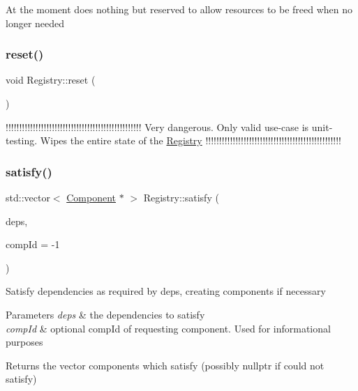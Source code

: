 At the moment does nothing but reserved to allow resources to be freed when no longer needed \mbox{\label{classtheoria_1_1core_1_1Registry_af66ab76f6173d7e7c99a0c47dc2bfd70}} 
\subsubsection{\texorpdfstring{reset()}{reset()}}
{\footnotesize\ttfamily void Registry\+::reset (\begin{DoxyParamCaption}{ }\end{DoxyParamCaption})}

!!!!!!!!!!!!!!!!!!!!!!!!!!!!!!!!!!!!!!!!!!!!!!!!!! Very dangerous. Only valid use-\/case is unit-\/testing. Wipes the entire state of the \hyperlink{classtheoria_1_1core_1_1Registry}{Registry} !!!!!!!!!!!!!!!!!!!!!!!!!!!!!!!!!!!!!!!!!!!!!!!!!! \mbox{\label{classtheoria_1_1core_1_1Registry_aaa8dbdd7993478eea310fa111e36d40a}} 
\subsubsection{\texorpdfstring{satisfy()}{satisfy()}}
{\footnotesize\ttfamily std\+::vector$<$ \hyperlink{classtheoria_1_1core_1_1Component}{Component} $\ast$ $>$ Registry\+::satisfy (\begin{DoxyParamCaption}\item[{const \hyperlink{classtheoria_1_1core_1_1Dependencies}{Dependencies} \&}]{deps,  }\item[{Comp\+Id}]{comp\+Id = {\ttfamily -\/1} }\end{DoxyParamCaption})}

Satisfy dependencies as required by deps, creating components if necessary


\begin{DoxyParams}{Parameters}
{\em deps} & the dependencies to satisfy \\
\hline
{\em comp\+Id} & optional comp\+Id of requesting component. Used for informational purposes \\
\hline
\end{DoxyParams}
\begin{DoxyReturn}{Returns}
the vector components which satisfy (possibly nullptr if could not satisfy) 
\end{DoxyReturn}
\mbox{\label{classtheoria_1_1core_1_1Registry_a07940fe9f04fa89130432610d02aa0df}} 
